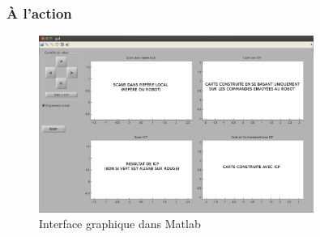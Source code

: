     \begin{frame}
        \frametitle{À l'action}
            \begin{figure}                 
                \includegraphics[width=0.8\textwidth]{./media/labo.png}
                \caption{Interface graphique dans Matlab}
            \end{figure}
    \end{frame}